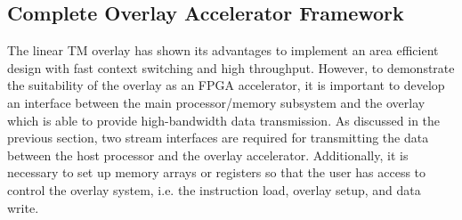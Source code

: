 \subsection{Complete Overlay Accelerator Framework}
The linear TM overlay has shown its advantages to implement an area efficient design with fast context switching and high throughput. 
However, to demonstrate the suitability of the overlay as an FPGA accelerator, it is important to develop an interface between the main processor/memory subsystem and the overlay which is able to provide high-bandwidth data transmission. 
As discussed in the previous section, two stream interfaces are required for transmitting the data between the host processor and the overlay accelerator. 
Additionally, it is necessary to set up memory arrays or registers so that the user has access to control the overlay system, i.e. the instruction load, overlay setup, and data write. 

